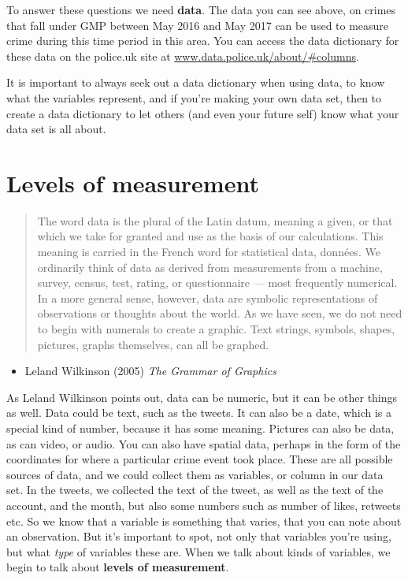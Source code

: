 \documentclass[
]{book}
\providecommand{\tightlist}{%
  \setlength{\itemsep}{0pt}\setlength{\parskip}{0pt}}
\begin{document}
To answer these questions we need \textbf{data}. The data you can see above, on crimes that fall under GMP between May 2016 and May 2017 can be used to measure crime during this time period in this area. You can access the data dictionary for these data on the police.uk site at \href{https://data.police.uk/about/\#columns}{www.data.police.uk/about/\#columns}.

It is important to always seek out a data dictionary when using data, to know what the variables represent, and if you're making your own data set, then to create a data dictionary to let others (and even your future self) know what your data set is all about.

\hypertarget{levels-of-measurement}{%
\section{Levels of measurement}\label{levels-of-measurement}}

\begin{quote}
The word data is the plural of the Latin datum, meaning a given, or that which we take for granted and use as the basis of our calculations. This meaning is carried in the French word for statistical data, données. We ordinarily think of data as derived from measurements from a machine, survey, census, test, rating, or questionnaire --- most frequently numerical. In a more general sense, however, data are symbolic representations of observations or thoughts about the world. As we have seen, we do not need to begin with numerals to create a graphic. Text strings, symbols, shapes, pictures, graphs themselves, can all be graphed.
\end{quote}

\begin{itemize}
\tightlist
\item
  Leland Wilkinson (2005) \emph{The Grammar of Graphics}
\end{itemize}

As Leland Wilkinson points out, data can be numeric, but it can be other things as well. Data could be text, such as the tweets. It can also be a date, which is a special kind of number, because it has some meaning. Pictures can also be data, as can video, or audio. You can also have spatial data, perhaps in the form of the coordinates for where a particular crime event took place. These are all possible sources of data, and we could collect them as variables, or column in our data set. In the tweets, we collected the text of the tweet, as well as the text of the account, and the month, but also some numbers such as number of likes, retweets etc. So we know that a variable is something that varies, that you can note about an observation. But it's important to spot, not only that variables you're using, but what \emph{type} of variables these are. When we talk about kinds of variables, we begin to talk about \textbf{levels of measurement}.
\end{document}

